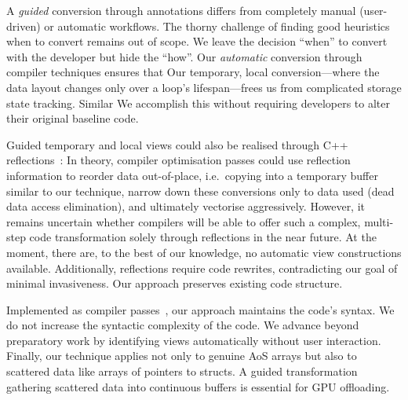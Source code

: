 %
%
A \emph{guided} conversion \cite{Jubertie:2018:DataLayoutAbstractionLayers,Xu:2014:SemiAutomaticComposition} through annotations differs from completely manual (user-driven) or automatic workflows.
The thorny challenge of finding good heuristics when to convert remains out of scope.
We leave the decision ``when'' to convert with the developer but hide the ``how''.
Our \emph{automatic} conversion through compiler techniques ensures that 
Our temporary, local conversion---where the data layout changes only over a loop's lifespan---frees us from complicated storage state tracking. 
Similar 
We accomplish this without requiring developers to alter their original baseline code.




Guided temporary and local views could also be realised through C++ reflections~\cite{Childers:2024:CPPReflections}:
In theory, compiler optimisation passes could use reflection information to reorder data out-of-place, i.e.~copying into a temporary buffer similar to our technique, narrow down these conversions only to data used (dead data access elimination), and ultimately vectorise aggressively.
However, it remains uncertain whether compilers will be able to offer such a complex, multi-step code transformation solely through reflections in the near future.
At the moment, there are, to the best of our knowledge, no automatic view constructions available.
Additionally, reflections require code rewrites, contradicting our goal of minimal invasiveness.
Our approach preserves existing code structure.



Implemented as compiler passes~\cite{Xu:2014:SemiAutomaticComposition}, our approach maintains the code's syntax.
We do not increase the syntactic complexity of the code.
We advance beyond preparatory work \cite{Radtke:2024:AoS2SoA} by identifying views automatically without user interaction. 
Finally, our technique applies not only to genuine AoS arrays but also to scattered data like arrays of pointers to structs.
A guided transformation gathering scattered data into continuous buffers is essential for GPU offloading.


